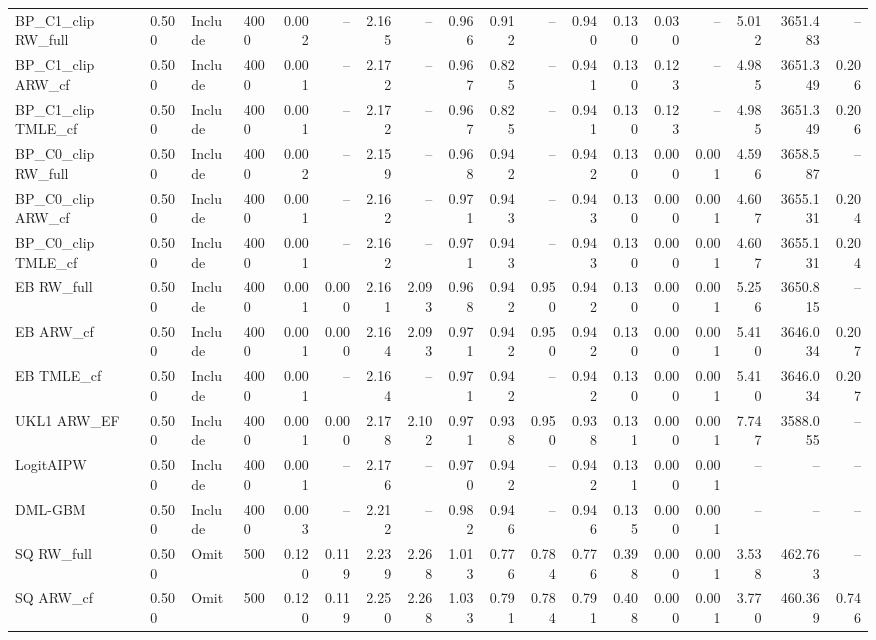 \begin{tabular}{llllrrrrrrrrrrrrrr}
BP\_C1\_clip RW\_full & 0.500 & Include & 4000 & 0.002 & -- & 2.165 & -- & 0.966 & 0.912 & -- & 0.940 & 0.130 & 0.030 & -- & 5.012 & 3651.483 & -- \\
BP\_C1\_clip ARW\_cf & 0.500 & Include & 4000 & 0.001 & -- & 2.172 & -- & 0.967 & 0.825 & -- & 0.941 & 0.130 & 0.123 & -- & 4.985 & 3651.349 & 0.206 \\
BP\_C1\_clip TMLE\_cf & 0.500 & Include & 4000 & 0.001 & -- & 2.172 & -- & 0.967 & 0.825 & -- & 0.941 & 0.130 & 0.123 & -- & 4.985 & 3651.349 & 0.206 \\
BP\_C0\_clip RW\_full & 0.500 & Include & 4000 & 0.002 & -- & 2.159 & -- & 0.968 & 0.942 & -- & 0.942 & 0.130 & 0.000 & 0.001 & 4.596 & 3658.587 & -- \\
BP\_C0\_clip ARW\_cf & 0.500 & Include & 4000 & 0.001 & -- & 2.162 & -- & 0.971 & 0.943 & -- & 0.943 & 0.130 & 0.000 & 0.001 & 4.607 & 3655.131 & 0.204 \\
BP\_C0\_clip TMLE\_cf & 0.500 & Include & 4000 & 0.001 & -- & 2.162 & -- & 0.971 & 0.943 & -- & 0.943 & 0.130 & 0.000 & 0.001 & 4.607 & 3655.131 & 0.204 \\
EB RW\_full & 0.500 & Include & 4000 & 0.001 & 0.000 & 2.161 & 2.093 & 0.968 & 0.942 & 0.950 & 0.942 & 0.130 & 0.000 & 0.001 & 5.256 & 3650.815 & -- \\
EB ARW\_cf & 0.500 & Include & 4000 & 0.001 & 0.000 & 2.164 & 2.093 & 0.971 & 0.942 & 0.950 & 0.942 & 0.130 & 0.000 & 0.001 & 5.410 & 3646.034 & 0.207 \\
EB TMLE\_cf & 0.500 & Include & 4000 & 0.001 & -- & 2.164 & -- & 0.971 & 0.942 & -- & 0.942 & 0.130 & 0.000 & 0.001 & 5.410 & 3646.034 & 0.207 \\
UKL1 ARW\_EF & 0.500 & Include & 4000 & 0.001 & 0.000 & 2.178 & 2.102 & 0.971 & 0.938 & 0.950 & 0.938 & 0.131 & 0.000 & 0.001 & 7.747 & 3588.055 & -- \\
LogitAIPW & 0.500 & Include & 4000 & 0.001 & -- & 2.176 & -- & 0.970 & 0.942 & -- & 0.942 & 0.131 & 0.000 & 0.001 & -- & -- & -- \\
DML-GBM & 0.500 & Include & 4000 & 0.003 & -- & 2.212 & -- & 0.982 & 0.946 & -- & 0.946 & 0.135 & 0.000 & 0.001 & -- & -- & -- \\
SQ RW\_full & 0.500 & Omit & 500 & 0.120 & 0.119 & 2.239 & 2.268 & 1.013 & 0.776 & 0.784 & 0.776 & 0.398 & 0.000 & 0.001 & 3.538 & 462.763 & -- \\
SQ ARW\_cf & 0.500 & Omit & 500 & 0.120 & 0.119 & 2.250 & 2.268 & 1.033 & 0.791 & 0.784 & 0.791 & 0.408 & 0.000 & 0.001 & 3.770 & 460.369 & 0.746 \\

\end{tabular}
